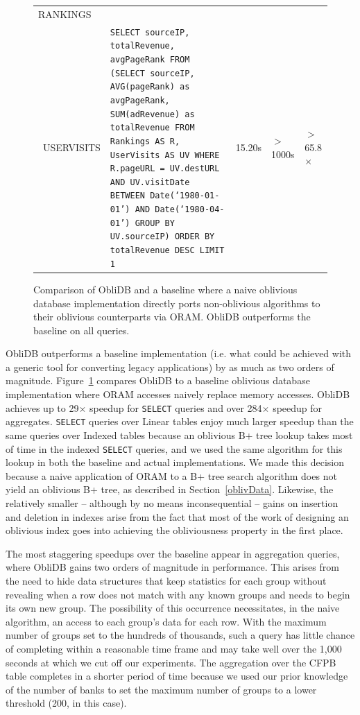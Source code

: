\documentclass[letterpaper,twocolumn,10pt]{article}
\def\name/{ObliDB}
\begin{document}
\begin{figure}
\begin{tabular}{p{2.2cm} p{7cm} l l l}
RANKINGS \\\ USERVISITS  & \texttt{SELECT sourceIP, totalRevenue, avgPageRank
FROM
  (SELECT sourceIP,
          AVG(pageRank) as avgPageRank,
          SUM(adRevenue) as totalRevenue
    FROM Rankings AS R, UserVisits AS UV
    WHERE R.pageURL = UV.destURL
       AND UV.visitDate BETWEEN Date(`1980-01-01') AND Date(`1980-04-01')
    GROUP BY UV.sourceIP)
  ORDER BY totalRevenue DESC LIMIT 1} & 15.20s & $>$1000s& $>$65.8$\times$\\
\end{tabular}
\caption{Comparison of \name/ and a baseline where a naive oblivious database implementation directly ports non-oblivious algorithms to their oblivious counterparts via ORAM. \name/ outperforms the baseline on all queries.}
\label{figQueries}
\end{figure}
\name/ outperforms a baseline implementation (i.e. what could be achieved with a generic tool for converting legacy applications) by as much as two orders of magnitude. Figure~\ref{figQueries} compares \name/ to a baseline oblivious database implementation where ORAM accesses naively replace memory accesses. \name/ achieves up to 29$\times$ speedup for \texttt{SELECT} queries and over 284$\times$ speedup for aggregates. \texttt{SELECT} queries over Linear tables enjoy much larger speedup than the same queries over Indexed tables because an oblivious B+ tree lookup takes most of time in the indexed \texttt{SELECT} queries, and we used the same algorithm for this lookup in both the baseline and actual implementations. We made this decision because a naive application of ORAM to a B+ tree search algorithm does not yield an oblivious B+ tree, as described in Section~\ref{oblivData}. Likewise, the relatively smaller -- although by no means inconsequential -- gains on insertion and deletion in indexes arise from the fact that most of the work of designing an oblivious index goes into achieving the obliviousness property in the first place. 

The most staggering speedups over the baseline appear in aggregation queries, where \name/ gains two orders of magnitude in performance. This arises from the need to hide data structures that keep statistics for each group without revealing when a row does not match with any known groups and needs to begin its own new group. The possibility of this occurrence necessitates, in the naive algorithm, an access to each group's data for each row. With the maximum number of groups set to the hundreds of thousands, such a query has little chance of completing within a reasonable time frame and may take well over the 1,000 seconds at which we cut off our experiments. The aggregation over the CFPB table completes in a shorter period of time because we used our prior knowledge of the number of banks to set the maximum number of groups to a lower threshold (200, in this case).
\end{document}
